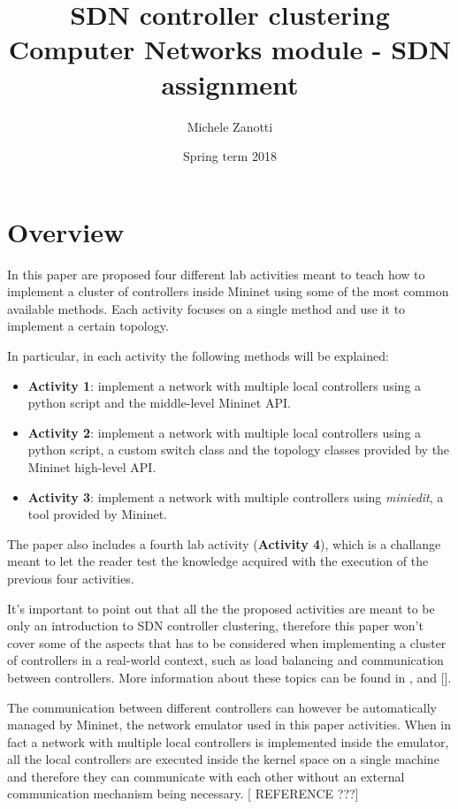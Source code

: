 \documentclass[12pt, a4paper]{article}
\title{SDN controller clustering \\ \large Computer Networks module - SDN assignment}
\author{Michele Zanotti}
\date{Spring term 2018}
\begin{document}
\maketitle
\newpage

\section*{Overview}
In this paper are proposed four different lab activities meant to teach how to implement
a cluster of controllers inside Mininet using some of the most common available methods.
Each activity focuses on a single method and use it to implement a certain topology.

In particular, in each activity the following methods will be explained:
\begin{itemize}
  \item \textbf{Activity 1}: implement a network with multiple local controllers using a python
  script and the middle-level Mininet API.
  \item \textbf{Activity 2}: implement a network with multiple local controllers using a python
  script, a custom switch class and the topology classes provided by the Mininet high-level API.
  \item \textbf{Activity 3}: implement a network with multiple controllers using
  \emph{miniedit}, a tool provided by Mininet.
\end{itemize}

The paper also includes a fourth lab activity (\textbf{Activity 4}), which is a challange meant
to let the reader test the knowledge acquired with the execution of the previous
four activities.

It's important to point out that all the the proposed activities are meant to be
only an introduction to SDN controller clustering, therefore this paper won't cover
some of the aspects that has to be considered when implementing a cluster of
controllers in a real-world context, such as load balancing and communication
between controllers. More information about these topics can be found in
\cite{ref-1}, \cite{ref-2} and [].

The communication between different controllers can however be automatically managed
by Mininet, the network emulator used in this paper activities. When in fact a
network with multiple local controllers is implemented inside the emulator, all
the local controllers are executed inside the kernel space on a single machine
and therefore they can communicate with each other without an external
communication mechanism being necessary. [ REFERENCE ???]
\end{document}
